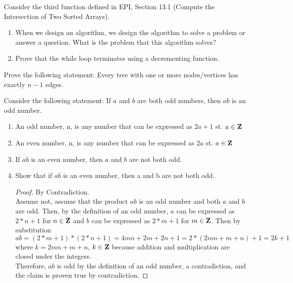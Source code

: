 \documentclass{article}
\author{Elliott Pryor}
\date{due: 6 September 2019}
\begin{document}
\nextprob
Consider the third function defined in EPI, Section 13.1 (Compute the
Intersection of Two Sorted Arrays).
\begin{enumerate}
    \item When we design an algorithm, we design the algorithm to solve a
        problem or answer a question.  What is the problem that this algorithm
        solves?
    \item Prove that the while loop terminates using a decrementing function.
\end{enumerate}

\nextprob
Prove the following statement: Every tree with one or more nodes/vertices has
exactly $n-1$ edges.

\nextprob
Consider the following statement: If $a$ and $b$ are both odd numbers, then $ab$ is
an odd number.
\begin{enumerate}
    \item An odd number, n, is any number that can be expressed as $2a + 1$ st. $a \in \mathbf{Z}$
    \item An even number, n, is any number that can be expressed as $2a$ st. $a \in \mathbf{Z}$
    \item If $ab$ is an even number, then $a$ and $b$ are not both odd.
    \item Show that if $ab$ is an even number, then a and b are not both odd.
    	
    	\begin{proof} By Contradiction. \\
Assume not, assume that the product $ab$ is an odd number and both $a$ and $b$ 				are odd. Then, by the definition of an odd number, $a$ can be expressed as $2*n + 1$ for $n \in \mathbf{Z}$ and $b$ can be expressed as $2*m + 1$ for $m \in \mathbf{Z}$. Then by substitution $ab = (2*m + 1) * (2*n + 1) = 4mn + 2m + 2n + 1 = 2 *(2mn + m + n) + 1 = 2k + 1$ where $k = 2mn + m + n$, $k \in \mathbf{Z}$ because addition and multiplication are closed under the integers. \\
Therefore, $ab$ is odd by the definition of an odd number, a contradiction, and the claim is proven true by contradiction.
    	\end{proof}
    	
\end{enumerate}
\end{document}
